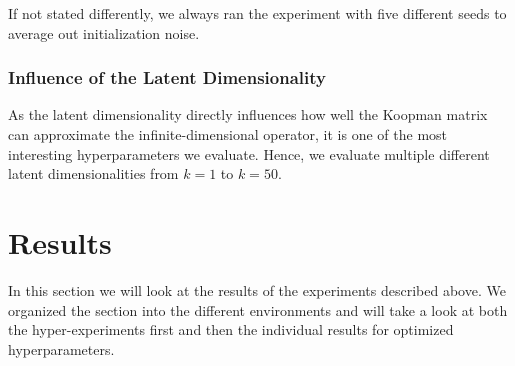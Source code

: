 		If not stated differently, we always ran the experiment with five different seeds to average out initialization noise.

		\subsubsection{Influence of the Latent Dimensionality}
			\label{subsec:experimentLatentDim}

			As the latent dimensionality directly influences how well the Koopman matrix can approximate the infinite-dimensional operator, it is one of the most interesting hyperparameters we evaluate. Hence, we evaluate multiple different latent dimensionalities from \( k = 1 \) to \( k = 50 \).

\section{Results}
	\label{sec:results}

	In this section we will look at the results of the experiments described above. We organized the section into the different environments and will take a look at both the hyper-experiments first and then the individual results for optimized hyperparameters.

